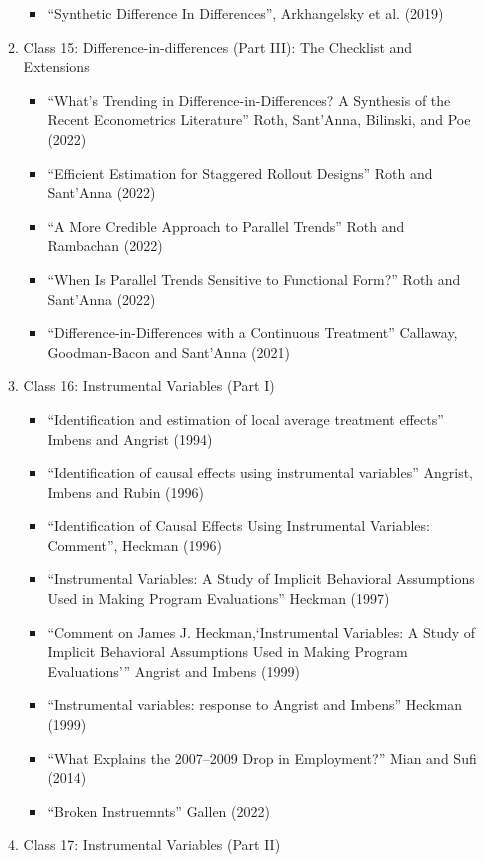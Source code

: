 \documentclass[11pt, a4paper]{article}
\begin{document}
\begin{enumerate}
\begin{enumerate}
\begin{itemize}
    \item ``Synthetic Difference In Differences'', Arkhangelsky et al. (2019)
    \end{itemize}
  \item Class 15: Difference-in-differences (Part III): The Checklist and Extensions
    \begin{itemize}
    \item ``What’s Trending in Difference-in-Differences? A Synthesis of the Recent Econometrics Literature'' Roth, Sant’Anna,  Bilinski, and Poe (2022)
    \item ``Efficient Estimation for Staggered Rollout Designs'' Roth and Sant'Anna (2022)
    \item ``A More Credible Approach to Parallel Trends'' Roth and Rambachan (2022)
    \item ``When Is Parallel Trends Sensitive to Functional Form?'' Roth and Sant'Anna (2022)
    \item ``Difference-in-Differences with a Continuous Treatment'' Callaway, Goodman-Bacon and Sant'Anna (2021)
    \end{itemize}
  \item Class 16: Instrumental Variables (Part I)
    \begin{itemize}
    \item ``Identification and estimation of local average treatment effects'' Imbens and Angrist (1994)
    \item ``Identification of causal effects using instrumental variables'' Angrist, Imbens and Rubin (1996)
    \item ``Identification of Causal Effects Using Instrumental Variables: Comment'', Heckman (1996)
    \item ``Instrumental Variables: A Study of Implicit Behavioral Assumptions Used in Making Program Evaluations'' Heckman (1997)
    \item ``Comment on James J. Heckman,`Instrumental Variables: A Study of Implicit Behavioral Assumptions Used in Making Program Evaluations''' Angrist and Imbens (1999)
    \item ``Instrumental variables: response to Angrist and Imbens'' Heckman (1999)
    \item ``What Explains the 2007–2009 Drop in Employment?'' Mian and Sufi (2014)
    \item ``Broken Instruemnts'' Gallen (2022)
    \end{itemize}
  \item Class 17: Instrumental Variables (Part II)

\end{enumerate}
\end{enumerate}
\end{document}
